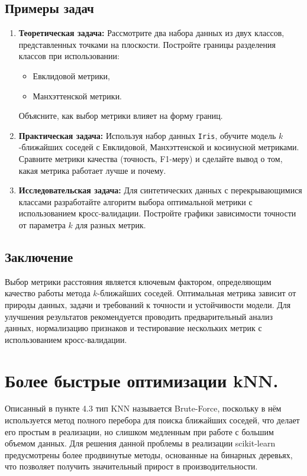 \subsection{Примеры задач}

\begin{enumerate}
    \item \textbf{Теоретическая задача:}
    Рассмотрите два набора данных из двух классов, представленных точками на плоскости.
    Постройте границы разделения классов при использовании:
    \begin{itemize}
        \item Евклидовой метрики,
        \item Манхэттенской метрики.
    \end{itemize}
    Объясните, как выбор метрики влияет на форму границ.

    \item \textbf{Практическая задача:}
    Используя набор данных \texttt{Iris}, обучите модель \(k\)-ближайших соседей с Евклидовой, Манхэттенской и косинусной метриками. Сравните метрики качества (точность, F1-меру) и сделайте вывод о том, какая метрика работает лучше и почему.

    \item \textbf{Исследовательская задача:}
    Для синтетических данных с перекрывающимися классами разработайте алгоритм выбора оптимальной метрики с использованием кросс-валидации. Постройте графики зависимости точности от параметра \(k\) для разных метрик.
\end{enumerate}

\subsection{Заключение}

Выбор метрики расстояния является ключевым фактором, определяющим качество работы метода \(k\)-ближайших соседей. Оптимальная метрика зависит от природы данных, задачи и требований к точности и устойчивости модели. Для улучшения результатов рекомендуется проводить предварительный анализ данных, нормализацию признаков и тестирование нескольких метрик с использованием кросс-валидации.

\section{Более быстрые оптимизации kNN.}

Описанный в пункте 4.3 тип KNN называется Brute-Force, поскольку в нём используется метод полного перебора для поиска ближайших соседей, что делает его простым в реализации, но слишком медленным при работе с большим объемом данных. Для решения данной проблемы в реализации scikit-learn предусмотрены более продвинутые методы, основанные на бинарных деревьях, что позволяет получить значительный прирост в производительности.

